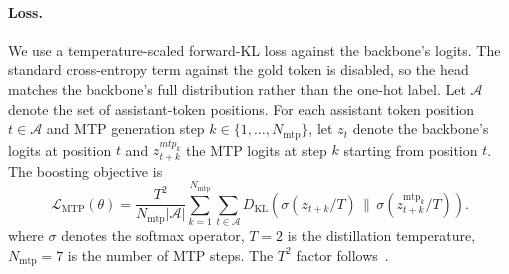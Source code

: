 \paragraph{Loss.}
We use a temperature-scaled forward-KL loss against the backbone's logits. The standard cross-entropy term against the gold token is disabled, so the head matches the backbone's full distribution rather than the one-hot label. Let $\mathcal{A}$ denote the set of assistant-token positions. For each assistant token position $t\in \mathcal{A}$ and MTP generation step $k \in \{1,\ldots,N_{\mathrm{mtp}}\}$, let $z_t$ denote the backbone's logits at position $t$ and $z^{mtp_k}_{t+k}$ the MTP logits at step $k$ starting from position $t$. The boosting objective is
\begin{equation}
\mathcal{L}_{\mathrm{MTP}}(\theta)
=
\frac{T^{2}}{N_{\mathrm{mtp}}|\mathcal{A}|}
\sum_{k=1}^{N_{\mathrm{mtp}}}
\sum_{t \in \mathcal{A}}
D_{\mathrm{KL}}\!\left(
\sigma\!\left(z_{t+k}/T\right)
\,\Big\|\,
\sigma\!\left(z^{\mathrm{mtp}_k}_{t+k}/T\right)
\right).
\label{eq:mtp_kd}
\end{equation}
where $\sigma$ denotes the softmax operator, $T = 2$ is the distillation temperature, $N_{\mathrm{mtp}}=7$ is the number of MTP steps. The $T^{2}$ factor follows~\citep{hinton2015distilling}.%

